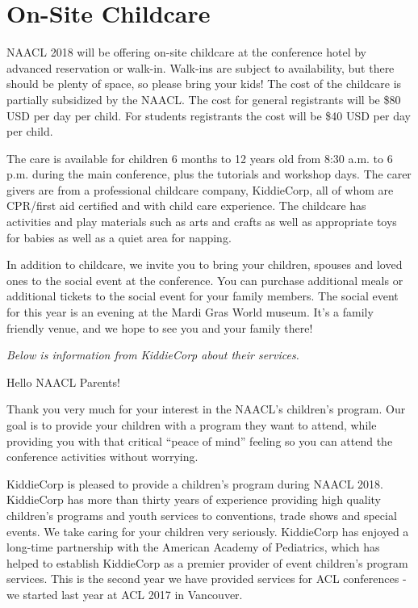 \chapter{On-Site Childcare}

NAACL 2018 will be offering on-site childcare at the conference hotel by advanced reservation or walk-in.   Walk-ins are subject to availability, but there should be plenty of space, so please bring your kids!  The cost of the childcare is partially subsidized by the NAACL. The cost for general registrants will be \$80 USD per day per child. For students registrants the cost will be \$40 USD per day per child.

The care is available for children 6 months to 12 years old from 8:30 a.m. to 6 p.m. during the main conference, plus the tutorials and workshop days. The carer givers are from a professional childcare company, KiddieCorp, all of whom are CPR/first aid certified and with child care experience. The childcare has activities and play materials such as arts and crafts as well as appropriate toys for babies as well as a quiet area for napping.  

In addition to childcare, we invite you to bring your children, spouses and loved ones to the social event at the conference. You can purchase additional meals or additional tickets to the social event for your family members. The social event for this year is an evening at the Mardi Gras World museum. It's a family friendly venue, and we hope to see you and your family there!



\emph{Below is information from KiddieCorp about their services.}


Hello NAACL Parents!

Thank you very much for your interest in the NAACL's children's program.
Our goal is to provide your children with a program they want to attend,
while providing you with that critical ``peace of mind'' feeling so you can
attend the conference activities without worrying.

KiddieCorp is pleased to provide a children's program during NAACL 2018.
KiddieCorp has more than thirty years of experience providing high quality
children's programs and youth services to conventions, trade shows and
special events. We take caring for your children very seriously. KiddieCorp
has enjoyed a long-time partnership with the American Academy of Pediatrics,
which has helped to establish KiddieCorp as a premier provider of event
children's program services.  This is the second year we have provided
services for ACL conferences - we started last year at ACL 2017 in
Vancouver. 


